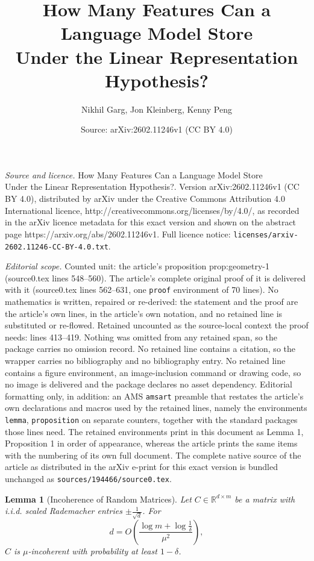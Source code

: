 \documentclass[10pt,a4paper]{amsart}
\title{How Many Features Can a Language Model Store\\Under the Linear Representation Hypothesis?}
\author{Nikhil Garg, Jon Kleinberg, Kenny Peng}
\date{Source: arXiv:2602.11246v1 (CC BY 4.0)}
\newtheorem{lemma}{Lemma}
\newcommand{\RR}{\mathbb{R}}
\begin{document}
\maketitle

\noindent\emph{Source and licence.} How Many Features Can a Language Model Store\\Under the Linear Representation Hypothesis?. Version arXiv:2602.11246v1 (CC BY 4.0), distributed by arXiv under the Creative Commons Attribution 4.0 International licence, http://creativecommons.org/licenses/by/4.0/, as recorded in the arXiv licence metadata for this exact version and shown on the abstract page https://arxiv.org/abs/2602.11246v1. Full licence notice: \texttt{licenses/arxiv-2602.11246-CC-BY-4.0.txt}.\par\smallskip

\noindent\textit{Editorial scope.} Counted unit: the article's proposition prop:geometry-1 (source0.tex lines 548--560). The article's complete original proof of it is delivered with it (source0.tex lines 562--631, one \texttt{proof} environment of 70 lines). No mathematics is written, repaired or re-derived: the statement and the proof are the article's own lines, in the article's own notation, and no retained line is substituted or re-flowed.  Retained uncounted as the source-local context the proof needs: lines 413--419.  Nothing was omitted from any retained span, so the package carries no omission record.  No retained line contains a citation, so the wrapper carries no bibliography and no bibliography entry.  No retained line contains a figure environment, an image-inclusion command or drawing code, so no image is delivered and the package declares no asset dependency.  Editorial formatting only, in addition: an AMS \texttt{amsart} preamble that restates the article's own declarations and macros used by the retained lines, namely the environments \texttt{lemma}, \texttt{proposition} on separate counters, together with the standard packages those lines need.  The retained environments print in this document as Lemma 1, Proposition 1 in order of appearance, whereas the article prints the same items with the numbering of its own full document.  The complete native source of the article as distributed in the arXiv e-print for this exact version is bundled unchanged as \texttt{sources/194466/source0.tex}.
\begin{lemma}[Incoherence of Random Matrices]\label{prop:incoherent}
    Let $C\in \RR^{d\times m}$ be a matrix with i.i.d. scaled Rademacher entries $\pm\frac{1}{\sqrt{d}}$. For
    \begin{equation}
        d = O\left(\frac{\log m + \log \frac{1}{\delta}}{\mu^2}\right),
    \end{equation}
    $C$ is $\mu$-incoherent with probability at least $1 - \delta$.
\end{lemma}
\end{document}
